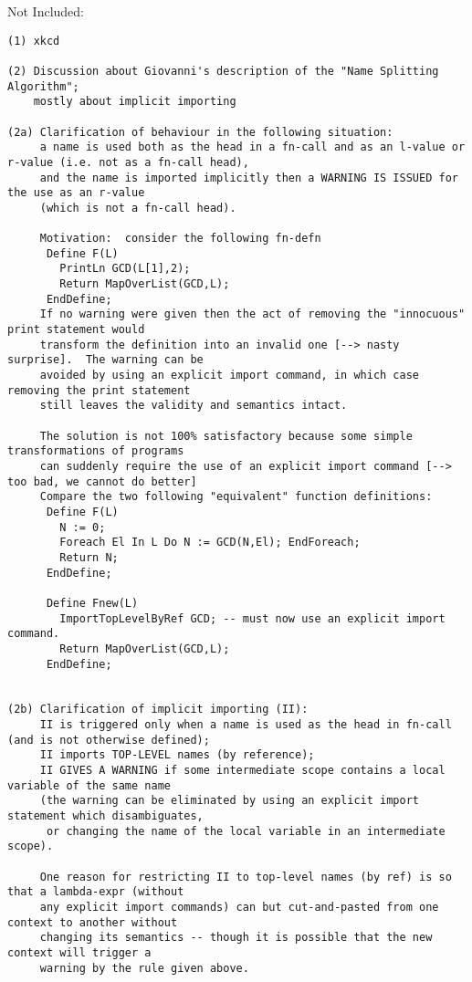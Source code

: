 \documentclass{book}[12,a4paper]
\def\refandpage#1{{\ref{#1}, pg.\pageref{#1}}}
\begin{document}
Not Included: %
\begin{verbatim}
(1) xkcd

(2) Discussion about Giovanni's description of the "Name Splitting Algorithm";
    mostly about implicit importing

(2a) Clarification of behaviour in the following situation:
     a name is used both as the head in a fn-call and as an l-value or r-value (i.e. not as a fn-call head),
     and the name is imported implicitly then a WARNING IS ISSUED for the use as an r-value
     (which is not a fn-call head).

     Motivation:  consider the following fn-defn
      Define F(L)
        PrintLn GCD(L[1],2);
        Return MapOverList(GCD,L);
      EndDefine;
     If no warning were given then the act of removing the "innocuous" print statement would
     transform the definition into an invalid one [--> nasty surprise].  The warning can be
     avoided by using an explicit import command, in which case removing the print statement
     still leaves the validity and semantics intact.

     The solution is not 100% satisfactory because some simple transformations of programs
     can suddenly require the use of an explicit import command [--> too bad, we cannot do better]
     Compare the two following "equivalent" function definitions:
      Define F(L)
        N := 0;
        Foreach El In L Do N := GCD(N,El); EndForeach;
        Return N;
      EndDefine;

      Define Fnew(L)
        ImportTopLevelByRef GCD; -- must now use an explicit import command.
        Return MapOverList(GCD,L);
      EndDefine;


(2b) Clarification of implicit importing (II):
     II is triggered only when a name is used as the head in fn-call (and is not otherwise defined);
     II imports TOP-LEVEL names (by reference);
     II GIVES A WARNING if some intermediate scope contains a local variable of the same name
     (the warning can be eliminated by using an explicit import statement which disambiguates,
      or changing the name of the local variable in an intermediate scope).

     One reason for restricting II to top-level names (by ref) is so that a lambda-expr (without
     any explicit import commands) can but cut-and-pasted from one context to another without
     changing its semantics -- though it is possible that the new context will trigger a
     warning by the rule given above.



\end{verbatim}
\end{document}
